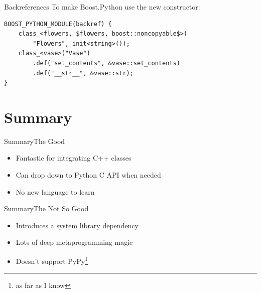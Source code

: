 \documentclass{beamer}
\begin{document}
\begin{frame}[fragile=singleslide]{Backreferences}
  To make Boost.Python use the new constructor:
  \begin{lstlisting}[language={[extra]C++}]
BOOST_PYTHON_MODULE(backref) {
    class_<flowers, $flowers, boost::noncopyable$>(
        "Flowers", init<string>());
    class_<vase>("Vase")
        .def("set_contents", &vase::set_contents)
        .def("__str__", &vase::str);
}
  \end{lstlisting}
\end{frame}

\section*{Summary}

\begin{frame}[<+->]{Summary}{The Good}
  \begin{itemize}
    \item Fantastic for integrating C++ classes
    \item Can drop down to Python C API when needed
    \item No new language to learn
  \end{itemize}
\end{frame}

\begin{frame}[<+->]{Summary}{The Not So Good}
  \begin{itemize}
    \item Introduces a system library dependency
    \item Lots of deep metaprogramming magic
    \item Doesn't support PyPy\footnote{as far as I know}
  \end{itemize}
\end{frame}
\end{document}
